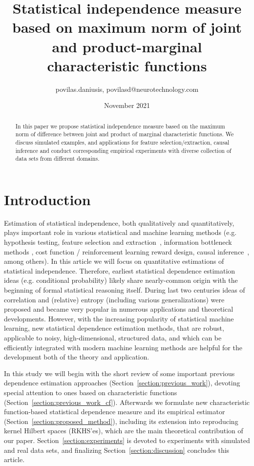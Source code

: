 \documentclass{article}
\title{Statistical independence measure based on maximum norm of joint and product-marginal characteristic functions}
\author{povilas.daniusis, povilasd@neurotechnology.com}
\date{November 2021}
\begin{document}
\maketitle

%

\begin{abstract}
    In this paper we propose statistical independence measure based on the maximum norm of difference between joint and product of marginal characteristic functions. We discuss simulated examples, and applications for feature selection/extraction, causal inference and conduct corresponding empirical experiments with diverse collection of data sets from different domains.
\end{abstract}

\section{Introduction}
Estimation of statistical independence, both qualitatively and quantitatively, plays important role in various statistical and machine learning methods (e.g. hypothesis testing, feature selection and extraction~\cite{?}, information bottleneck methods \cite{?}, cost function / reinforcement learning reward design, causal inference~\cite{?}, among others). In this article we will focus on quantitative estimations of statistical independence. Therefore, earliest statistical dependence estimation ideas (e.g. conditional probability) likely share nearly-common origin with the beginning of formal statistical reasoning itself. During last two centuries ideas of correlation and (relative) entropy (including various generalizations) were proposed and became very popular in numerous applications and theoretical developments. However, with the increasing popularity of statistical machine learning, new statistical dependence estimation methods, that are robust, applicable to noisy, high-dimensional, structured data, and which can be efficiently integrated with modern machine learning methods are helpful for the development both of the theory and application.

In this study we will begin with the short review of some important previous dependence estimation approaches (Section~\ref{section:previous_work}), devoting special attention to ones based on characteristic functions (Section~\ref{section:previous_work_cf}). Afterwards we formulate new characteristic function-based statistical dependence measure and its empirical estimator (Section~\ref{section:proposed_method}), including its extension into reproducing kernel Hilbert spaces (RKHS'es), which are the main theoretical contribution of our paper. Section~\ref{section:experiments} is devoted to experiments with simulated and real data sets, and finalizing Section~\ref{section:discussion} concludes this article.
\end{document}
